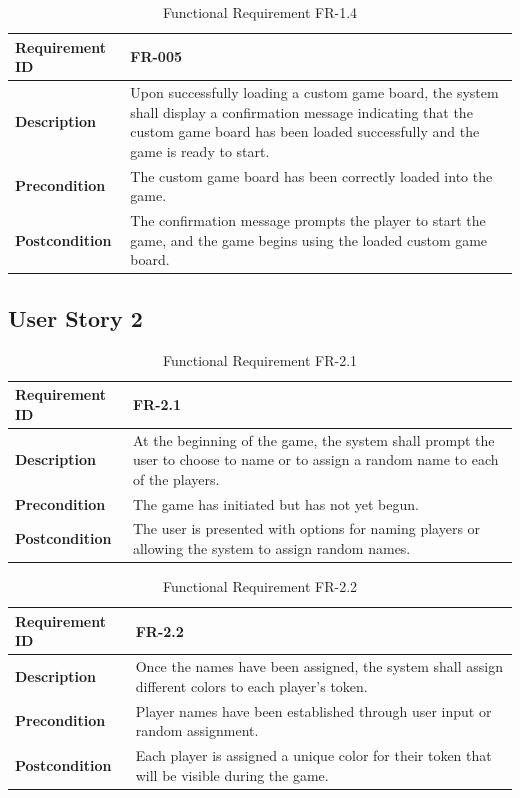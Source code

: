 \documentclass{article}
\begin{document}
\begin{table}[ht]
    \centering
    \caption{Functional Requirement FR-1.4}
    \begin{tabular}{@{}P{3cm}P{12cm}@{}}
        \toprule
        \textbf{Requirement ID} & FR-005 \\ \midrule
        \textbf{Description} & Upon successfully loading a custom game board, the system shall display a confirmation message indicating that the custom game board has been loaded successfully and the game is ready to start. \\ \midrule
        \textbf{Precondition} & The custom game board has been correctly loaded into the game. \\ \midrule
        \textbf{Postcondition} & The confirmation message prompts the player to start the game, and the game begins using the loaded custom game board. \\ \bottomrule
    \end{tabular}
\end{table}

\clearpage

\subsection{User Story 2}

\begin{table}[ht]
    \centering
    \caption{Functional Requirement FR-2.1}
    \begin{tabular}{@{}P{3cm}P{12cm}@{}}
        \toprule
        \textbf{Requirement ID} & FR-2.1 \\ \midrule
        \textbf{Description} & At the beginning of the game, the system shall prompt the user to choose to name or to assign a random name to each of the players. \\ \midrule
        \textbf{Precondition} & The game has initiated but has not yet begun. \\ \midrule
        \textbf{Postcondition} & The user is presented with options for naming players or allowing the system to assign random names. \\ \bottomrule
    \end{tabular}
\end{table}

\begin{table}[ht]
    \centering
    \caption{Functional Requirement FR-2.2}
    \begin{tabular}{@{}P{3cm}P{12cm}@{}}
        \toprule
        \textbf{Requirement ID} & FR-2.2 \\ \midrule
        \textbf{Description} & Once the names have been assigned, the system shall assign different colors to each player’s token. \\ \midrule
        \textbf{Precondition} & Player names have been established through user input or random assignment. \\ \midrule
        \textbf{Postcondition} & Each player is assigned a unique color for their token that will be visible during the game. \\ \bottomrule
    \end{tabular}
\end{table}
\end{document}
